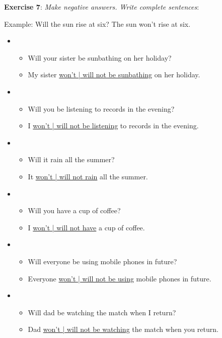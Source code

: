 \textbf{Exercise 7}: \textit{Make negative answers. Write complete sentences}:

Example:
Will the sun rise at six?
The sun won't rise at six.

\begin{itemize}

\item
\begin{itemize}
\item Will your sister be sunbathing on her holiday?
\item My sister \underline{won't | will not be sunbathing} on her holiday.
\end{itemize}

\item
\begin{itemize}
\item Will you be listening to records in the evening?
\item I \underline{won't | will not be listening} to records in the evening.
\end{itemize}

\item
\begin{itemize}
\item Will it rain all the summer?
\item It \underline{won't | will not rain} all the summer.
\end{itemize}

\item
\begin{itemize}
\item Will you have a cup of coffee?
\item I \underline{won't | will not have} a cup of coffee.
\end{itemize}

\item
\begin{itemize}
\item Will everyone be using mobile phones in future?
\item Everyone \underline{won't | will not be using} mobile phones in future.
\end{itemize}

\item
\begin{itemize}
\item Will dad be watching the match when I return?
\item Dad \underline{won't | will not be watching} the match when you return.
\end{itemize}


\end{itemize}
